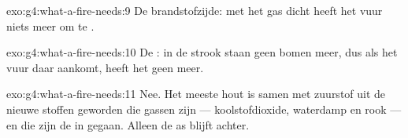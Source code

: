 \begin{solution}{exo:g4:what-a-fire-needs:9}
De brandstofzijde: met het gas dicht heeft het vuur niets meer om te
.
\end{solution}

\begin{solution}{exo:g4:what-a-fire-needs:10}
De : in de strook staan geen bomen meer, dus als het vuur daar
aankomt, heeft het geen  meer.
\end{solution}

\begin{solution}{exo:g4:what-a-fire-needs:11}
Nee. Het meeste hout is samen met zuurstof uit de  nieuwe stoffen
geworden die gassen zijn --- koolstofdioxide, waterdamp en rook --- en
die zijn de  in gegaan. Alleen de as blijft achter.
\end{solution}

